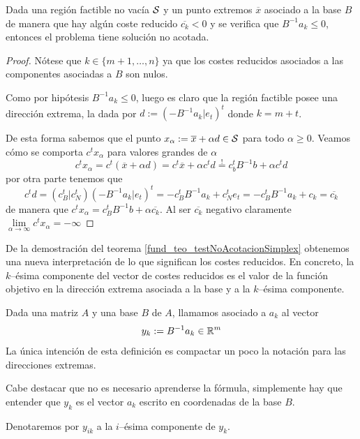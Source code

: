 \begin{theo}
	\label{fund_teo_testNoAcotacionSimplex}
	Dada una región factible no vacía $\mathcal{S}$ y un punto extremos $\overline{x}$ asociado a la base $B$ de manera que hay algún coste reducido $\overline{c_k}<0$ y se verifica que $B^{-1}a_k\leq 0$, entonces el problema tiene solución no acotada.
\end{theo}
\begin{proof}
	Nótese que $k\in\{m+1,\dots,n\}$ ya que los costes reducidos asociados a las componentes asociadas a $B$ son nulos.
	
	Como por hipótesis $B^{-1}a_k\leq 0$, luego es claro que la región factible posee una dirección extrema, la dada por $d:=(-B^{-1}a_k|e_t)^t$ donde $k=m+t$.
	
	De esta forma sabemos que el punto $x_\alpha:=\overline{x}+\alpha d\in\mathcal{S}$ para todo $\alpha\geq 0$. Veamos cómo se comporta $c^tx_\alpha$ para valores grandes de $\alpha$
	\begin{equation*}
		c^tx_\alpha=c^t(\overline{x}+\alpha d)=c^t\overline{x}+\alpha c^td\stackrel{!}{=}c_b^tB^{-1}b+\alpha c^td
	\end{equation*}
	por otra parte tenemos que
	\begin{equation*}
		c^td =(c_B^t|c_N^t)(-B^{-1}a_k|e_t)^t=-c_B^tB^{-1}a_k+c_N^te_t=-c_B^tB^{-1}a_k+c_k=\overline{c_k}
	\end{equation*}
	de manera que $c^tx_\alpha=c_B^tB^{-1}b+\alpha\overline{c_k}$. Al ser $\overline{c_k}$ negativo claramente $\lim\limits_{\alpha\to\infty}c^tx_\alpha=-\infty$
\end{proof}
\begin{obs}
	De la demostración del teorema \ref{fund_teo_testNoAcotacionSimplex} obtenemos una nueva interpretación de lo que significan los costes reducidos. En concreto, la $k$--ésima componente del vector de costes reducidos es el valor de la función objetivo en la dirección extrema asociada a la base y a la $k$--ésima componente. 
\end{obs}
\begin{defi}
	Dada una matriz $A$ y una base $B$ de $A$, llamamos  asociado a $a_k$ al vector
	\begin{equation*}
		y_k:=B^{-1}a_k\in\mathbb{R}^m
	\end{equation*}
	La única intención de esta definición es compactar un poco la notación para las direcciones extremas.
	
	Cabe destacar que no es necesario aprenderse la fórmula, simplemente hay que entender que $y_k$ es el vector $a_k$ escrito en coordenadas de la base $B$.
	
	Denotaremos por $y_{ik}$ a la $i$--ésima componente de $y_k$.
\end{defi}
